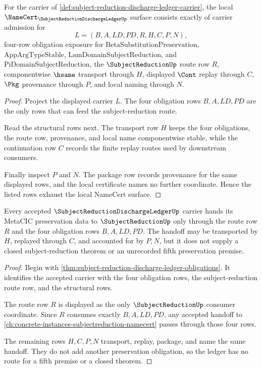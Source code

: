 \begin{theorem}
\label{thm:subject-reduction-discharge-ledger-obligations}
For the carrier of \autoref{def:subject-reduction-discharge-ledger-carrier}, the local $\NameCert_{\SubjectReductionDischargeLedgerUp}$ surface consists exactly of carrier admission for
$$
L=(B,A,LD,PD,R,H,C,P,N),
$$
four-row obligation exposure for $\mathrm{BetaSubstitutionPreservation}$, $\mathrm{AppArgTypeStable}$, $\mathrm{LamDomainSubjectReduction}$, and $\mathrm{PiDomainSubjectReduction}$, the $\SubjectReductionUp$ route row $R$, componentwise $\hsame$ transport through $H$, displayed $\Cont$ replay through $C$, $\Pkg$ provenance through $P$, and local naming through $N$.
\end{theorem}
\begin{proof}
Project the displayed carrier $L$. The four obligation rows $B,A,LD,PD$ are the only rows that can feed the subject-reduction route.

Read the structural rows next. The transport row $H$ keeps the four obligations, the route row, provenance, and local name componentwise stable, while the continuation row $C$ records the finite replay routes used by downstream consumers.

Finally inspect $P$ and $N$. The package row records provenance for the same displayed rows, and the local certificate names no further coordinate. Hence the listed rows exhaust the local NameCert surface.
\end{proof}

\begin{theorem}
\label{thm:subject-reduction-discharge-ledger-subjectreduction-handoff}
Every accepted $\SubjectReductionDischargeLedgerUp$ carrier hands its MetaCIC preservation data to $\SubjectReductionUp$ only through the route row $R$ and the four obligation rows $B,A,LD,PD$. The handoff may be transported by $H$, replayed through $C$, and accounted for by $P,N$, but it does not supply a closed subject-reduction theorem or an unrecorded fifth preservation premise.
\end{theorem}
\begin{proof}
Begin with \autoref{thm:subject-reduction-discharge-ledger-obligations}. It identifies the accepted carrier with the four obligation rows, the subject-reduction route row, and the structural rows.

The route row $R$ is displayed as the only $\SubjectReductionUp$ consumer coordinate. Since $R$ consumes exactly $B,A,LD,PD$, any accepted handoff to \autoref{ch:concrete-instances-subjectreduction-namecert} passes through those four rows.

The remaining rows $H,C,P,N$ transport, replay, package, and name the same handoff. They do not add another preservation obligation, so the ledger has no route for a fifth premise or a closed theorem.
\end{proof}

